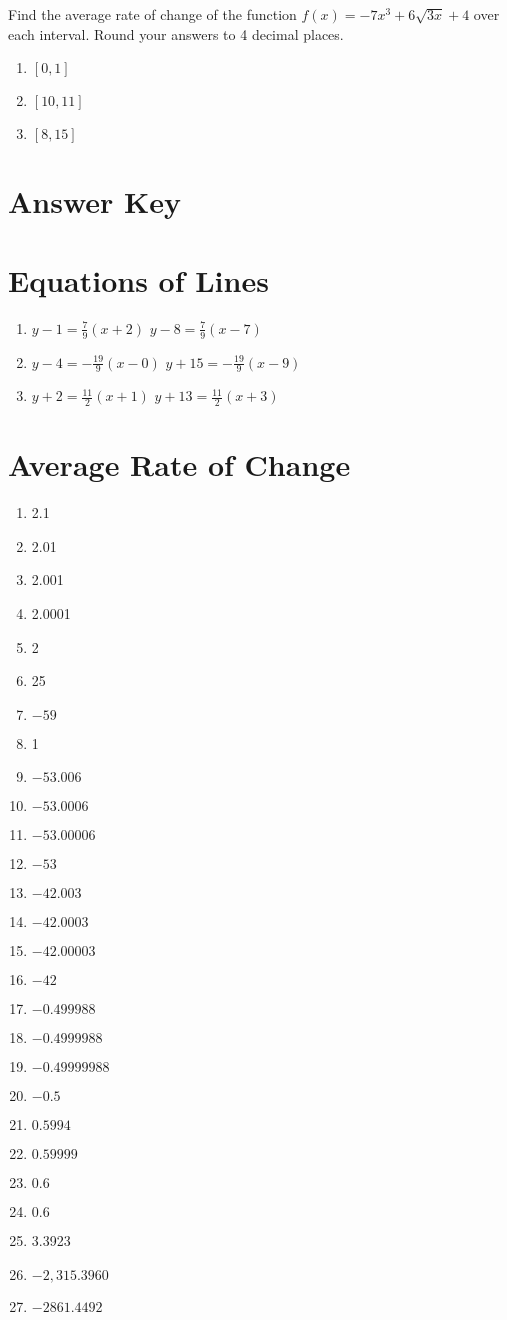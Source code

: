 Find the average rate of change of the function $f(x) = -7x^3 + 6\sqrt{3x} + 4$ over each interval. Round your answers to 4 decimal places.
\begin{enumerate}	\setcounter{enumi}{\value{Review}}
	\item $[0,1]$
	\item $[10,11]$
	\item $[8,15]$
\end{enumerate}	\setcounter{Review}{\value{enumi}}

\newpage

\section{Answer Key}

\section*{Equations of Lines}
\begin{enumerate}
\item $y-1 = \frac{7}{9}(x+2)$  $y-8=\frac{7}{9}(x-7)$
    \item $y-4 = -\frac{19}{9}(x-0)$  $y+15=-\frac{19}{9}(x-9)$
    \item $y+2 = \frac{11}{2}(x+1)$  $y+13=\frac{11}{2}(x+3)$
\end{enumerate}

\section*{Average Rate of Change}
\begin{multicols}{3}
\begin{enumerate}
\item 2.1
\item 2.01
\item 2.001
\item 2.0001
\item 2
\item 25
\item $-59$
\item 1
\item $-53.006$
\item $-53.0006$
\item $-53.00006$
\item $-53$
\item $-42.003$
\item $-42.0003$
\item $-42.00003$
\item $-42$
\item $-0.499988$
\item $-0.4999988$
\item $-0.49999988$
\item $-0.5$
\item $0.5994$
\item $0.59999$
\item $0.6$
\item $0.6$
\item 3.3923
\item $-2,315.3960$
\item $-2861.4492$
\end{enumerate}
\end{multicols}